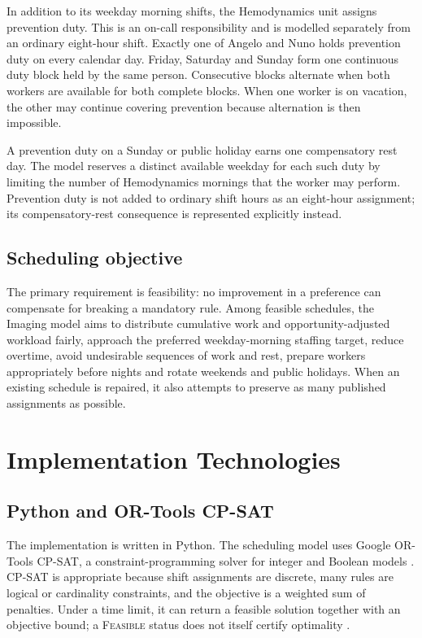 \documentclass[11pt,a4paper]{article}
\begin{document}
In addition to its weekday morning shifts, the Hemodynamics unit assigns prevention duty. This is an on-call responsibility and is modelled separately from an ordinary eight-hour shift. Exactly one of Angelo and Nuno holds prevention duty on every calendar day. Friday, Saturday and Sunday form one continuous duty block held by the same person. Consecutive blocks alternate when both workers are available for both complete blocks. When one worker is on vacation, the other may continue covering prevention because alternation is then impossible.

A prevention duty on a Sunday or public holiday earns one compensatory rest day. The model reserves a distinct available weekday for each such duty by limiting the number of Hemodynamics mornings that the worker may perform. Prevention duty is not added to ordinary shift hours as an eight-hour assignment; its compensatory-rest consequence is represented explicitly instead.

\subsection{Scheduling objective}

The primary requirement is feasibility: no improvement in a preference can compensate for breaking a mandatory rule. Among feasible schedules, the Imaging model aims to distribute cumulative work and opportunity-adjusted workload fairly, approach the preferred weekday-morning staffing target, reduce overtime, avoid undesirable sequences of work and rest, prepare workers appropriately before nights and rotate weekends and public holidays. When an existing schedule is repaired, it also attempts to preserve as many published assignments as possible.

\section{Implementation Technologies}

\subsection{Python and OR-Tools CP-SAT}

The implementation is written in Python. The scheduling model uses Google OR-Tools CP-SAT, a constraint-programming solver for integer and Boolean models \cite{ortools}. CP-SAT is appropriate because shift assignments are discrete, many rules are logical or cardinality constraints, and the objective is a weighted sum of penalties. Under a time limit, it can return a feasible solution together with an objective bound; a \textsc{Feasible} status does not itself certify optimality \cite{ortools}.
\end{document}
